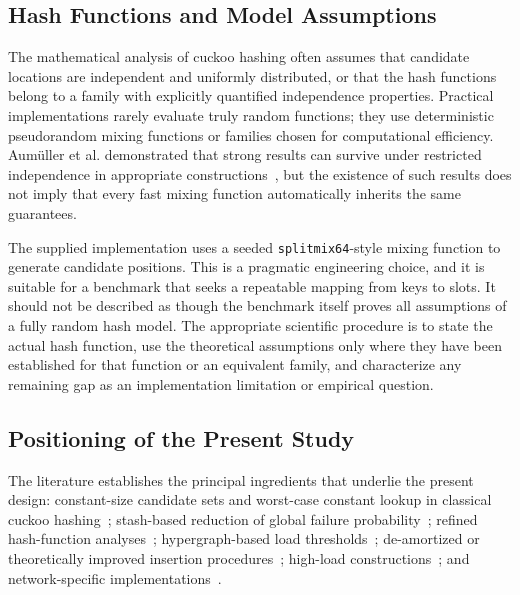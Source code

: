 \documentclass[conference]{IEEEtran}
\begin{document}
\subsection{Hash Functions and Model Assumptions}

The mathematical analysis of cuckoo hashing often assumes that candidate locations are independent and uniformly distributed, or that the hash functions belong to a family with explicitly quantified independence properties. Practical implementations rarely evaluate truly random functions; they use deterministic pseudorandom mixing functions or families chosen for computational efficiency. Aum\"uller et al. demonstrated that strong results can survive under restricted independence in appropriate constructions~\cite{aumuller2014explicit}, but the existence of such results does not imply that every fast mixing function automatically inherits the same guarantees.

The supplied implementation uses a seeded \texttt{splitmix64}-style mixing function to generate candidate positions. This is a pragmatic engineering choice, and it is suitable for a benchmark that seeks a repeatable mapping from keys to slots. It should not be described as though the benchmark itself proves all assumptions of a fully random hash model. The appropriate scientific procedure is to state the actual hash function, use the theoretical assumptions only where they have been established for that function or an equivalent family, and characterize any remaining gap as an implementation limitation or empirical question.

\subsection{Positioning of the Present Study}

The literature establishes the principal ingredients that underlie the present design: constant-size candidate sets and worst-case constant lookup in classical cuckoo hashing~\cite{pagh2004cuckoo}; stash-based reduction of global failure probability~\cite{kirsch2009stash}; refined hash-function analyses~\cite{aumuller2014explicit}; hypergraph-based load thresholds~\cite{fountoulakis2012sharp,dietzfelbinger2009tight}; de-amortized or theoretically improved insertion procedures~\cite{arbitman2009deamortized,walzer2022insertion,bell2024constant}; high-load constructions~\cite{kuszmaul2025bubbling}; and network-specific implementations~\cite{pontarelli2016parallel,pontarelli2016cuckoocache,lescouarnec2018cuckoopp,megias2025minimizing}.
\end{document}
